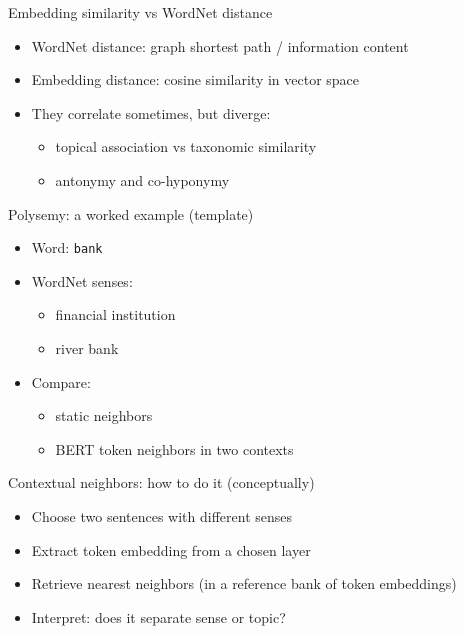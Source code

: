 \documentclass{beamer}
\begin{document}
\begin{frame}{Embedding similarity vs WordNet distance}
\begin{itemize}
  \item WordNet distance: graph shortest path / information content
  \item Embedding distance: cosine similarity in vector space
  \item They correlate sometimes, but diverge:
  \begin{itemize}
    \item topical association vs taxonomic similarity
    \item antonymy and co-hyponymy
  \end{itemize}
\end{itemize}
\end{frame}

\begin{frame}{Polysemy: a worked example (template)}
\begin{itemize}
  \item Word: \texttt{bank}
  \item WordNet senses:
  \begin{itemize}
    \item financial institution
    \item river bank
  \end{itemize}
  \item Compare:
  \begin{itemize}
    \item static neighbors
    \item BERT token neighbors in two contexts
  \end{itemize}
\end{itemize}
\end{frame}

\begin{frame}{Contextual neighbors: how to do it (conceptually)}
\begin{itemize}
  \item Choose two sentences with different senses
  \item Extract token embedding from a chosen layer
  \item Retrieve nearest neighbors (in a reference bank of token embeddings)
  \item Interpret: does it separate sense or topic?
\end{itemize}
\end{frame}
\end{document}
